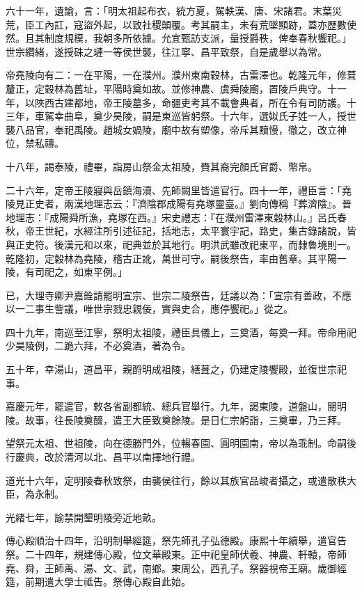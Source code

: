 \begin{pinyinscope}
六十一年，遺諭，言：「明太祖起布衣，統方夏，駕軼漢、唐、宋諸君。末葉災荒，臣工內訌，寇盜外起，以致社稷顛覆。考其嗣主，未有荒墜顯跡，蓋亦歷數使然。且其制度規模，我朝多所依據。允宜甄訪支派，量授爵秩，俾奉春秋饗祀。」世宗纘緒，遂授硃之璉一等侯世襲，往江寧、昌平致祭，自是歲舉以為常。

帝堯陵向有二：一在平陽，一在濮州。濮州東南穀林，古雷澤也。乾隆元年，修葺釐正，定穀林為舊址，平陽時奠如故。並修神農、虞舜陵廟，置陵戶典守。十一年，以陜西古建都地，帝王陵墓多，命疆吏考其不載會典者，所在令有司防護。十三年，車駕幸曲阜，奠少昊陵，嗣是東巡皆躬祭。十六年，選姒氏子姓一人，授世襲八品官，奉祀禹陵。趙城女媧陵，廟中故有塑像，帝斥其黷慢，徹之，改立神位，禁私禱。

十八年，謁泰陵，禮畢，詣房山祭金太祖陵，賚其裔完顏氏官爵、幣帛。

二十六年，定帝王陵寢與岳鎮海瀆、先師闕里皆遣官行。四十一年，禮臣言：「堯陵見正史者，兩漢地理志云：『濟陰郡成陽有堯塚靈臺。』劉向傳稱『葬濟陰』。晉地理志：『成陽舜所漁，堯塚在西。』宋史禮志：『在濮州雷澤東穀林山。』呂氏春秋，帝王世紀，水經注所引述征記，括地志，太平寰宇記，路史，集古錄諸說，皆與正史符。後漢元和以來，祀典並於其地行。明洪武雖改祀東平，而隸魯境則一。乾隆初，定穀林為堯陵，稽古正訛，萬世可守。嗣後祭告，率由舊章。其平陽一陵，有司祀之，如東平例。」

已，大理寺卿尹嘉銓請罷明宣宗、世宗二陵祭告，廷議以為：「宣宗有善政，不應以一二事生訾議，唯世宗戮忠親佞，實與史合，應停饗祀。」從之。

四十九年，南巡至江寧，祭明太祖陵，禮臣具儀上，三奠酒，每奠一拜。帝命用祀少昊陵例，二跪六拜，不必奠酒，著為令。

五十年，幸湯山，道昌平，親酹明成祖陵，繕葺之，仍建定陵饗殿，並復世宗祀事。

嘉慶元年，罷遣官，敕各省副都統、總兵官舉行。九年，謁東陵，道盤山，閱明陵。故事，往長陵奠醊，遣王大臣致奠餘陵。是日仁宗躬詣，三奠畢，乃三拜。

望祭元太祖、世祖陵，向在德勝門外，位暢春園、圓明園南，帝以為乖制。命嗣後行慶典，改於清河以北、昌平以南擇地行禮。

道光十六年，定明陵春秋致祭，由襲侯往行，餘以其族官品峻者攝之，或遣散秩大臣，為永制。

光緒七年，諭禁開墾明陵旁近地畝。

傳心殿順治十四年，沿明制舉經筵，祭先師孔子弘德殿。康熙十年續舉，遣官告祭。二十四年，規建傳心殿，位文華殿東。正中祀皇師伏羲、神農、軒轅，帝師堯、舜，王師禹、湯、文、武，南鄉。東周公，西孔子。祭器視帝王廟。歲御經筵，前期遣大學士祗告。祭傳心殿自此始。


\end{pinyinscope}
